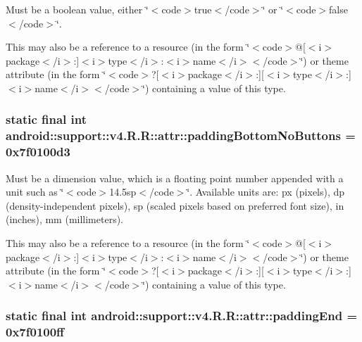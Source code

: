 Must be a boolean value, either \char`\"{}$<$code$>$true$<$/code$>$\char`\"{} or \char`\"{}$<$code$>$false$<$/code$>$\char`\"{}. 

This may also be a reference to a resource (in the form \char`\"{}$<$code$>$@\mbox{[}$<$i$>$package$<$/i$>$:\mbox{]}$<$i$>$type$<$/i$>$:$<$i$>$name$<$/i$>$$<$/code$>$\char`\"{}) or theme attribute (in the form \char`\"{}$<$code$>$?\mbox{[}$<$i$>$package$<$/i$>$:\mbox{]}\mbox{[}$<$i$>$type$<$/i$>$:\mbox{]}$<$i$>$name$<$/i$>$$<$/code$>$\char`\"{}) containing a value of this type. \hypertarget{classandroid_1_1support_1_1v4_1_1_r_1_1attr_5ae5c03050f1bbdc4a389a37c7eff11d}{
\subsubsection[{paddingBottomNoButtons}]{\setlength{\rightskip}{0pt plus 5cm}static final int android::support::v4.R.R::attr::paddingBottomNoButtons = 0x7f0100d3}}
\label{classandroid_1_1support_1_1v4_1_1_r_1_1attr_5ae5c03050f1bbdc4a389a37c7eff11d}


Must be a dimension value, which is a floating point number appended with a unit such as \char`\"{}$<$code$>$14.5sp$<$/code$>$\char`\"{}. Available units are: px (pixels), dp (density-independent pixels), sp (scaled pixels based on preferred font size), in (inches), mm (millimeters). 

This may also be a reference to a resource (in the form \char`\"{}$<$code$>$@\mbox{[}$<$i$>$package$<$/i$>$:\mbox{]}$<$i$>$type$<$/i$>$:$<$i$>$name$<$/i$>$$<$/code$>$\char`\"{}) or theme attribute (in the form \char`\"{}$<$code$>$?\mbox{[}$<$i$>$package$<$/i$>$:\mbox{]}\mbox{[}$<$i$>$type$<$/i$>$:\mbox{]}$<$i$>$name$<$/i$>$$<$/code$>$\char`\"{}) containing a value of this type. \hypertarget{classandroid_1_1support_1_1v4_1_1_r_1_1attr_7f6f5b836aeb10a23f617941fb69594a}{
\subsubsection[{paddingEnd}]{\setlength{\rightskip}{0pt plus 5cm}static final int android::support::v4.R.R::attr::paddingEnd = 0x7f0100ff}}
\label{classandroid_1_1support_1_1v4_1_1_r_1_1attr_7f6f5b836aeb10a23f617941fb69594a}


